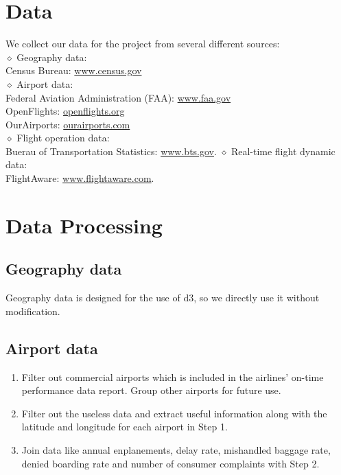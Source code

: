 \documentclass[12pt]{article}
\begin{document}
\section{Data}
    \noindent We collect our data for the project from several different sources:\\
    $\diamond$ Geography data:\\
    \indent Census Bureau: \url{www.census.gov}\\
    $\diamond$ Airport data:\\
    \indent Federal Aviation Administration (FAA): \url{www.faa.gov}\\
    \indent OpenFlights: \url{openflights.org}\\
    \indent OurAirports: \url{ourairports.com}\\
    $\diamond$ Flight operation data:\\
    \indent Buerau of Transportation Statistics: \url{www.bts.gov}.
    $\diamond$ Real-time flight dynamic data:\\
    \indent FlightAware: \url{www.flightaware.com}.

\section{Data Processing}
    \subsection{Geography data}
    Geography data is designed for the use of d3, so we directly use it without modification.
    
    \subsection{Airport data}
    \begin{enumerate}
    \item Filter out commercial airports which is included in the airlines' on-time performance data report. Group other airports for future use.
    \item Filter out the useless data and extract useful information along with the latitude and longitude for each airport in Step 1.
    \item Join data like annual enplanements, delay rate, mishandled baggage rate, denied boarding rate and number of consumer complaints with Step 2.
    \end{enumerate}
    
\end{document}
